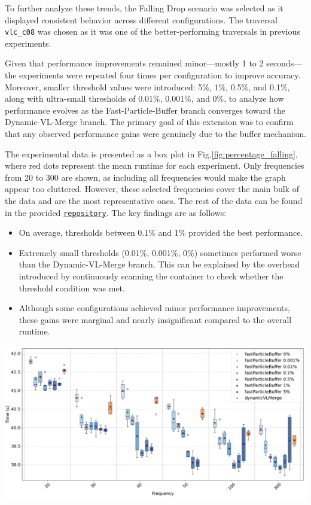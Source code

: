 To further analyze these trends, the Falling Drop scenario was selected as it displayed consistent behavior across different configurations. The traversal \texttt{vlc\_c08} was chosen as it was one of the better-performing traversals in previous experiments.


Given that performance improvements remained minor—mostly 1 to 2 seconds—the experiments were repeated four times per configuration to improve accuracy. Moreover, smaller threshold values were introduced:  
5\%, 1\%, 0.5\%, and 0.1\%, along with ultra-small thresholds of 0.01\%, 0.001\%, and 0\%, to analyze how performance evolves as the Fast-Particle-Buffer branch converges toward the Dynamic-VL-Merge branch. The primary goal of this extension was to confirm that any observed performance gains were genuinely due to the buffer mechanism.


The experimental data is presented as a box plot in Fig.\ref{fig:percentage_falling}, where red dots represent the mean runtime for each experiment. Only frequencies from 20 to 300 are shown, as including all frequencies would make the graph appear too cluttered. However, these selected frequencies cover the main bulk of the data and are the most representative ones. The rest of the data can be found in the provided \href{https://github.com/xhulia028/GraphView}{\texttt{repository}}. The key findings are as follows:

\begin{itemize}
    \item On average, thresholds between 0.1\% and 1\% provided the best performance.
    \item Extremely small thresholds (0.01\%, 0.001\%, 0\%) sometimes performed worse than the Dynamic-VL-Merge branch. This can be explained by the overhead introduced by continuously scanning the container to check whether the threshold condition was met.
    \item Although some configurations achieved minor performance improvements, these gains were marginal and nearly insignificant compared to the overall runtime.
\end{itemize}



\begin{center}
    \includegraphics[width=\linewidth]{graphs/percentage_vlcc08.png}
    \label{fig:percentage_falling}
\end{center}



